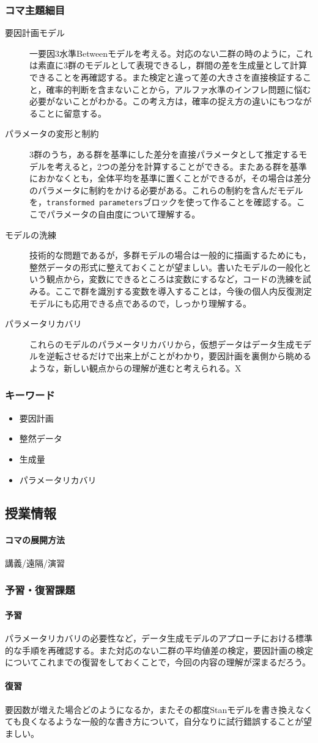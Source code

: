 \subsubsection{コマ主題細目}
\begin{description}
	\item[要因計画モデル] 一要因3水準Betweenモデルを考える。対応のない二群の時のように，これは素直に3群のモデルとして表現できるし，群間の差を生成量として計算できることを再確認する。また検定と違って差の大きさを直接検証すること，確率的判断を含まないことから，アルファ水準のインフレ問題に悩む必要がないことがわかる。この考え方は，確率の捉え方の違いにもつながることに留意する。
	\item[パラメータの変形と制約] 3群のうち，ある群を基準にした差分を直接パラメータとして推定するモデルを考えると，2つの差分を計算することができる。またある群を基準におかなくとも，全体平均を基準に置くことができるが，その場合は差分のパラメータに制約をかける必要がある。これらの制約を含んだモデルを，\verb|transformed parameters|ブロックを使って作ることを確認する。ここでパラメータの自由度について理解する。
	\item[モデルの洗練] 技術的な問題であるが，多群モデルの場合は一般的に描画するためにも，整然データの形式に整えておくことが望ましい。書いたモデルの一般化という観点から，変数にできるところは変数にするなど，コードの洗練を試みる。ここで群を識別する変数を導入することは，今後の個人内反復測定モデルにも応用できる点であるので，しっかり理解する。
	\item[パラメータリカバリ] これらのモデルのパラメータリカバリから，仮想データはデータ生成モデルを逆転させるだけで出来上がことがわかり，要因計画を裏側から眺めるような，新しい観点からの理解が進むと考えられる。X
\end{description}
\subsubsection{キーワード}
\begin{itemize}
	\item 要因計画
	\item 整然データ
	\item 生成量
	\item パラメータリカバリ
\end{itemize}
\subsection{授業情報}
\paragraph{コマの展開方法}
講義/遠隔/演習
\subsubsection{予習・復習課題}
\paragraph{予習}パラメータリカバリの必要性など，データ生成モデルのアプローチにおける標準的な手順を再確認する。また対応のない二群の平均値差の検定，要因計画の検定についてこれまでの復習をしておくことで，今回の内容の理解が深まるだろう。
\paragraph{復習}要因数が増えた場合どのようになるか，またその都度Stanモデルを書き換えなくても良くなるような一般的な書き方について，自分なりに試行錯誤することが望ましい。